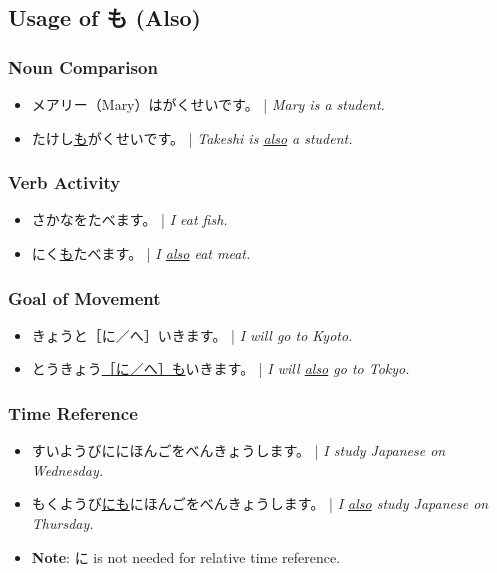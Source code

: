 \documentclass{article}
\begin{document}
\begin{CJK}{UTF8}{min}
\subsection{Usage of も (Also)}

\subsubsection{Noun Comparison}
\begin{itemize}
\item メアリー（Mary）はがくせいです。 | \emph{Mary is a student.}
\item たけし\uline{も}がくせいです。 | \emph{Takeshi is \uline{also} a student.}
\end{itemize}

\subsubsection{Verb Activity}
\begin{itemize}
\item さかなをたべます。 | \emph{I eat fish.}
\item にく\uline{も}たべます。 | \emph{I \uline{also} eat meat.}
\end{itemize}

\subsubsection{Goal of Movement}
\begin{itemize}
\item きょうと［に／へ］いきます。 | \emph{I will go to Kyoto.}
\item とうきょう\uline{［に／へ］も}いきます。 | \emph{I will \uline{also} go to Tokyo.}
\end{itemize}

\subsubsection{Time Reference}
\begin{itemize}
\item すいようびににほんごをべんきょうします。 | \emph{I study Japanese on Wednesday.}
\item もくようび\uline{にも}にほんごをべんきょうします。 | \emph{I \uline{also} study Japanese on Thursday.}
\item {\bf Note}: に is not needed for relative time reference.
\end{itemize}


\end{CJK}
\end{document}

